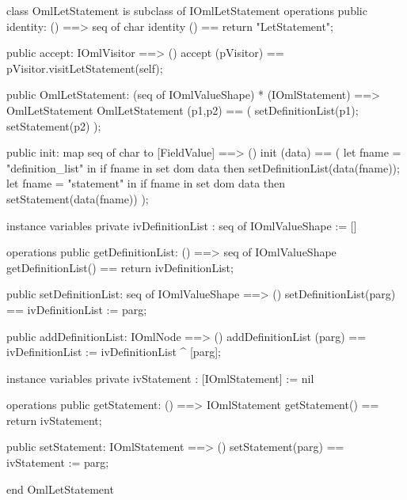 \begin{vdm_al}
class OmlLetStatement is subclass of IOmlLetStatement
operations
  public identity: () ==> seq of char
  identity () == return "LetStatement";

  public accept: IOmlVisitor ==> ()
  accept (pVisitor) == pVisitor.visitLetStatement(self);

  public OmlLetStatement:
      (seq of IOmlValueShape) *
      (IOmlStatement) ==> OmlLetStatement
  OmlLetStatement (p1,p2) == 
   ( setDefinitionList(p1);
     setStatement(p2) );

  public init: map seq of char to [FieldValue] ==> ()
  init (data) ==
    ( let fname = "definition_list" in
        if fname in set dom data
        then setDefinitionList(data(fname));
      let fname = "statement" in
        if fname in set dom data
        then setStatement(data(fname)) );

instance variables
  private ivDefinitionList : seq of IOmlValueShape := []

operations
  public getDefinitionList: () ==> seq of IOmlValueShape
  getDefinitionList() == return ivDefinitionList;

  public setDefinitionList: seq of IOmlValueShape ==> ()
  setDefinitionList(parg) == ivDefinitionList := parg;

  public addDefinitionList: IOmlNode ==> ()
  addDefinitionList (parg) == ivDefinitionList := ivDefinitionList ^ [parg];

instance variables
  private ivStatement : [IOmlStatement] := nil

operations
  public getStatement: () ==> IOmlStatement
  getStatement() == return ivStatement;

  public setStatement: IOmlStatement ==> ()
  setStatement(parg) == ivStatement := parg;

end OmlLetStatement
\end{vdm_al}

